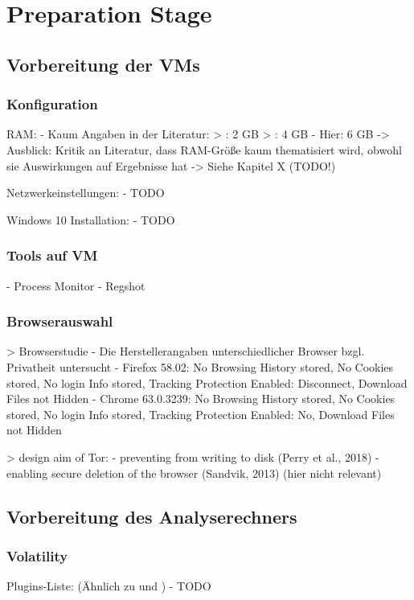 \section{Preparation Stage}
\Blindtext[1][3]

\subsection{Vorbereitung der VMs}

\subsubsection*{Konfiguration}
RAM:
	- Kaum Angaben in der Literatur:
		> \cite{Rochmadi.2017}: 2 GB 
		> \cite{Ohana.2013}: 4 GB
	- Hier: 6 GB 
	-> Ausblick: Kritik an Literatur, dass RAM-Größe kaum thematisiert wird, obwohl sie Auswirkungen auf Ergebnisse hat -> Siehe Kapitel X (TODO!)

Netzwerkeinstellungen: 
	- TODO

Windows 10 Installation:
	- TODO

\subsubsection*{Tools auf VM}
	- Process Monitor
	- Regshot

\subsubsection*{Browserauswahl}

> Browserstudie \cite{Izzati.2022}
	- Die Herstellerangaben unterschiedlicher Browser bzgl. Privatheit untersucht
	- Firefox 58.02: No Browsing History stored, No Cookies stored, No login Info stored, Tracking Protection Enabled: Disconnect, Download Files not Hidden
	- Chrome 63.0.3239: No Browsing History stored, No Cookies stored, No login Info stored, Tracking Protection Enabled: No, Download Files not Hidden

> design aim of Tor: \cite{Muir.2019}
	- preventing from writing to disk (Perry et al., 2018) 
	- enabling secure deletion of the browser (Sandvik, 2013) (hier nicht relevant)


\subsection{Vorbereitung des Analyserechners}

\subsubsection*{Volatility}
Plugins-Liste: (Ähnlich zu \cite{Hariharan} und \cite{Dayalamurthy.2013})
	- TODO
	
